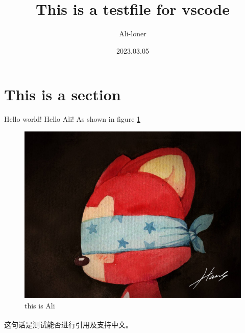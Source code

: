 \documentclass[fontset=windows]{article}
\title{\heiti\zihao{2} This is a testfile for vscode}
\author{\songti Ali-loner}
\date{2023.03.05}
\newcommand{\upcite}[1]{\textsuperscript{\cite{#1}}}
\begin{document}
	\maketitle
	\thispagestyle{empty}

\begin{abstract}
	\lipsum[2]
\end{abstract}

\tableofcontents

\section{This is a section}
Hello world! Hello Ali! As shown in figure \ref{1}
\begin{figure}[htbp]
	\centering
	\includegraphics[scale=0.2]{Ali.jpg}
	\caption{this is Ali}
	\label{1}
\end{figure}

这句话是测试能否进行引用及支持中文\upcite{1}。

\end{document}
